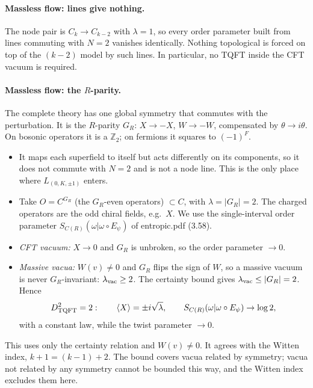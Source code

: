 \documentclass[11pt]{article}
\newcommand{\Z}{\mathbb{Z}}
\begin{document}
\paragraph{Massless flow: lines give nothing.} The node pair is $C_k\to C_{k-2}$ with $\lambda=1$, so every order parameter built from lines commuting with $N=2$ vanishes identically. Nothing topological is forced on top of the $(k-2)$ model by such lines. In particular, no TQFT inside the CFT vacuum is required.

\paragraph{Massless flow: the $R$-parity.} The complete theory has one global symmetry that commutes with the perturbation. It is the $R$-parity $G_R$: $X\to-X$, $W\to-W$, compensated by $\theta\to i\theta$. On bosonic operators it is a $\Z_2$; on fermions it squares to $(-1)^F$.
\begin{itemize}
\item It maps each superfield to itself but acts differently on its components, so it does not commute with $N=2$ and is not a node line. This is the only place where $L_{(0,K,\pm1)}$ enters.
\item Take $O=C^{G_R}$ (the $G_R$-even operators) $\subset C$, with $\lambda=|G_R|=2$. The charged operators are the odd chiral fields, e.g.\ $X$. We use the single-interval order parameter $S_{C(R)}(\omega|\omega\circ E_\psi)$ of entropic.pdf (3.58).
\item \emph{CFT vacuum:} $X\to0$ and $G_R$ is unbroken, so the order parameter $\to0$.
\item \emph{Massive vacua:} $W(v)\neq0$ and $G_R$ flips the sign of $W$, so a massive vacuum is never $G_R$-invariant: $\lambda_{\rm vac}\ge2$. The certainty bound gives $\lambda_{\rm vac}\le|G_R|=2$. Hence
\begin{equation}
D^2_{\rm TQFT}=2:\qquad \langle X\rangle=\pm i\sqrt\lambda,\qquad S_{C(R)}(\omega|\omega\circ E_\psi)\to\log2 ,
\end{equation}
with a constant law, while the twist parameter $\to0$.
\end{itemize}
This uses only the certainty relation and $W(v)\neq0$. It agrees with the Witten index, $k+1=(k-1)+2$. The bound covers vacua related by symmetry; vacua not related by any symmetry cannot be bounded this way, and the Witten index excludes them here.
\end{document}
